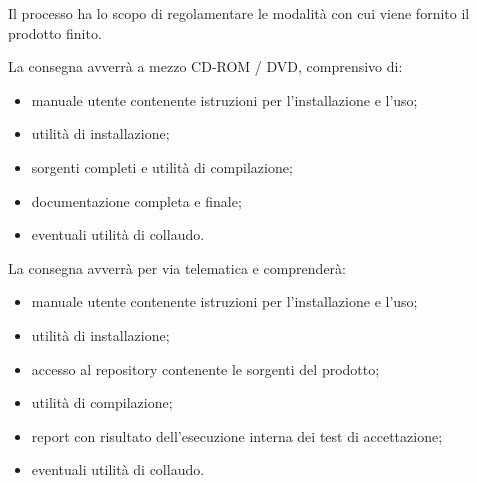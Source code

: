 Il processo ha lo scopo di regolamentare le modalità con cui viene fornito il prodotto finito.

La consegna avverrà a mezzo CD-ROM / DVD, comprensivo di:
\begin{itemize}
	\item manuale utente contenente istruzioni per l’installazione e l’uso;
	\item utilità di installazione; 
	\item sorgenti completi e utilità di compilazione;
	\item documentazione completa e finale;
	\item eventuali utilità di collaudo.
\end{itemize}

La consegna avverrà per via telematica e comprenderà:
\begin{itemize}
	\item manuale utente contenente istruzioni per l’installazione e l’uso;
	\item utilità di installazione;
	\item accesso al repository contenente le sorgenti del prodotto;
	\item utilità di compilazione;
	\item report con risultato dell’esecuzione interna dei test di accettazione;
	\item eventuali utilità di collaudo.
\end{itemize}
